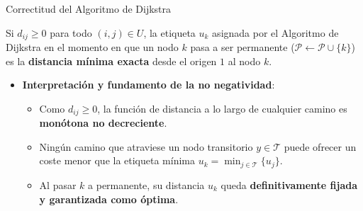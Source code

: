\documentclass[
  ignorenonframetext,
]{beamer}
\providecommand{\tightlist}{%
  \setlength{\itemsep}{0pt}\setlength{\parskip}{0pt}}
\begin{document}
\begin{frame}{Correctitud del Algoritmo de Dijkstra}
\label{correctitud-del-algoritmo-de-dijkstra}
\begin{tcolorbox}[enhanced jigsaw, colframe=quarto-callout-important-color-frame, toptitle=1mm, colback=white, colbacktitle=quarto-callout-important-color!10!white, titlerule=0mm, breakable, coltitle=black, opacityback=0, bottomrule=.15mm, title=\textcolor{quarto-callout-important-color}{\faExclamation}\hspace{0.5em}{Correctitud del algoritmo de Dijkstra}, rightrule=.15mm, arc=.35mm, leftrule=.75mm, left=2mm, toprule=.15mm, bottomtitle=1mm, opacitybacktitle=0.6]

Si \(d_{ij} \ge 0\) para todo \((i, j) \in U\), la etiqueta \(u_k\)
asignada por el Algoritmo de Dijkstra en el momento en que un nodo \(k\)
pasa a ser permanente
(\(\mathcal{P} \leftarrow \mathcal{P} \cup \{k\}\)) es la
\textbf{distancia mínima exacta} desde el origen \(1\) al nodo \(k\).

\end{tcolorbox}

\begin{itemize}
\tightlist
\item
  \textbf{Interpretación y fundamento de la no negatividad}:

  \begin{itemize}
  \tightlist
  \item
    Como \(d_{ij} \ge 0\), la función de distancia a lo largo de
    cualquier camino es \textbf{monótona no decreciente}.
  \item
    Ningún camino que atraviese un nodo transitorio
    \(y \in \mathcal{T}\) puede ofrecer un coste menor que la etiqueta
    mínima \(u_k = \min_{j \in \mathcal{T}} \{ u_j \}\).
  \item
    Al pasar \(k\) a permanente, su distancia \(u_k\) queda
    \textbf{definitivamente fijada y garantizada como óptima}.
  \end{itemize}
\end{itemize}
\end{frame}
\end{document}
